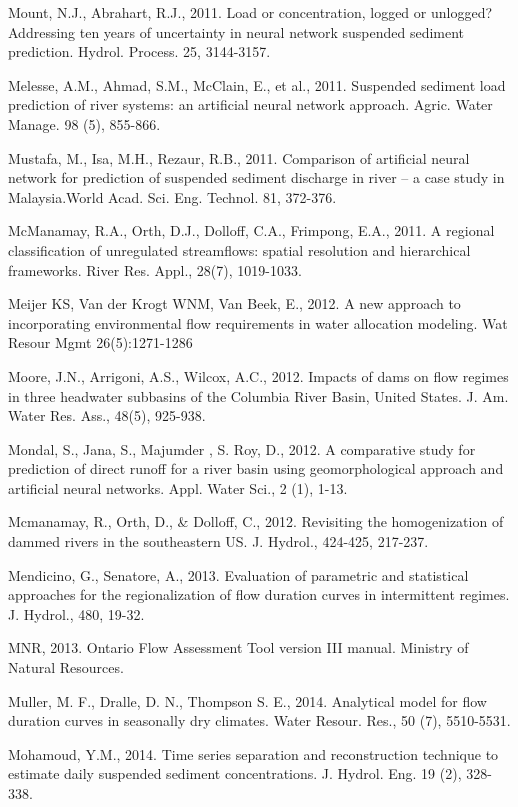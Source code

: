 \begin{hangingpar}{2em}
Mount, N.J., Abrahart, R.J., 2011. Load or concentration, logged or unlogged? Addressing ten years of uncertainty in neural network suspended sediment prediction. Hydrol. Process. 25, 3144-3157. 

Melesse, A.M., Ahmad, S.M., McClain, E., et al., 2011. Suspended sediment load prediction of river systems: an artificial neural network approach. Agric. Water Manage. 98 (5), 855-866. 

Mustafa, M., Isa, M.H., Rezaur, R.B., 2011. Comparison of artificial neural network for prediction of suspended sediment discharge in river – a case study in Malaysia.World Acad. Sci. Eng. Technol. 81, 372-376. 

McManamay, R.A., Orth, D.J., Dolloff, C.A., Frimpong, E.A., 2011. A regional classification of unregulated streamflows: spatial resolution and hierarchical frameworks. River Res. Appl., 28(7), 1019-1033.

Meijer KS, Van der Krogt WNM, Van Beek, E.,  2012.  A new approach to incorporating environmental flow requirements in water allocation modeling. Wat Resour Mgmt 26(5):1271-1286

Moore, J.N., Arrigoni, A.S., Wilcox, A.C., 2012. Impacts of dams on flow regimes in three headwater subbasins of the Columbia River Basin, United States. J. Am. Water Res. Ass., 48(5), 925-938.

Mondal, S., Jana, S., Majumder , S.  Roy, D., 2012. A comparative study for prediction of direct runoff for a river basin using geomorphological approach and artificial neural networks. Appl. Water Sci., 2 (1), 1-13. 

Mcmanamay, R., Orth, D., \& Dolloff, C., 2012. Revisiting the homogenization of dammed rivers in the southeastern US. J. Hydrol., 424-425, 217-237.

Mendicino, G., Senatore, A., 2013. Evaluation of parametric and statistical approaches for the regionalization of flow duration curves in intermittent regimes. J. Hydrol., 480, 19-32.

MNR, 2013. Ontario Flow Assessment Tool version III manual. Ministry of Natural Resources. 

Muller, M. F., Dralle, D. N., Thompson S. E., 2014. Analytical model for flow duration curves in seasonally dry climates. Water Resour. Res., 50 (7), 5510-5531.

Mohamoud, Y.M., 2014. Time series separation and reconstruction technique to estimate daily suspended sediment concentrations. J. Hydrol. Eng. 19 (2), 328-338.


\end{hangingpar}
